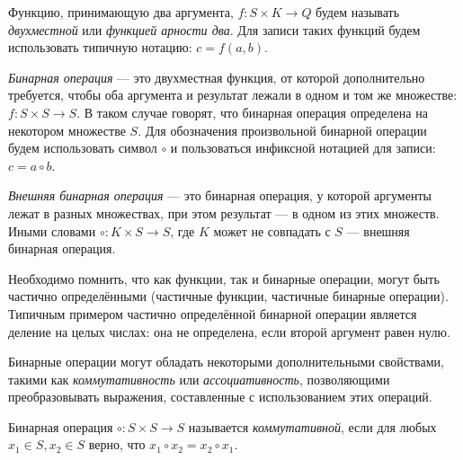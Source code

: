\begin{definition}
	Функцию, принимающую два аргумента, $f: S \times K \to Q$ будем называть \emph{двухместной} или \emph{функцией арности два}.
Для записи таких функций будем использовать типичную нотацию: $c = f(a,b)$.
\end{definition}


\begin{definition}
\emph{Бинарная операция} --- это двухместная функция, от которой дополнительно требуется, чтобы оба аргумента и результат лежали в одном и том же множестве: $f: S \times S \to S$. В таком случае говорят, что бинарная операция определена на некотором множестве $S$. Для обозначения произвольной бинарной операции будем использовать символ $\circ$ и пользоваться инфиксной нотацией для записи: $c = a \circ b$.
\end{definition}




\begin{definition}
\emph{Внешняя бинарная операция} --- это бинарная операция, у которой аргументы лежат в разных множествах, при этом результат --- в одном из этих множеств. Иными словами $\circ: K \times S \to S$, где $K$ может не совпадать с $S$  --- внешняя бинарная операция.
\end{definition}


Необходимо помнить, что как функции, так и бинарные операции, могут быть частично определёнными (частичные функции, частичные бинарные операции). Типичным примером частично определённой бинарной операции является деление на целых числах: она не определена, если второй аргумент равен нулю.


Бинарные операции могут обладать некоторыми дополнительными свойствами, такими как \textit{коммутативность} или \textit{ассоциативность}, позволяющими преобразовывать выражения, составленные с использованием этих операций.


\begin{definition}
Бинарная операция $\circ : S \times S \to S$ называется \emph{коммутативной}, если для любых  $x_1 \in S, x_2 \in S$ верно, что  $x_1 \circ x_2 = x_2 \circ x_1$.
\end{definition}

